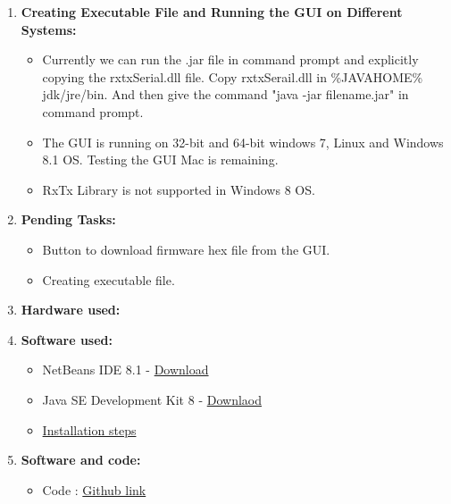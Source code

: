 \documentclass[a4paper,12pt,oneside]{book}
\begin{document}
\begin{enumerate}
\begin{itemize}
		\end{itemize}
		\item \textbf{\large Creating Executable File and Running the GUI on Different Systems:} \\
		\begin{itemize}
			\item Currently we can run the .jar file in command prompt and explicitly copying the rxtxSerial.dll file. Copy rxtxSerail.dll in \%JAVAHOME\% jdk/jre/bin. And then give the command "java -jar filename.jar" in command prompt.
		    \item The GUI is running on 32-bit and 64-bit windows 7, Linux and Windows 8.1 OS. Testing the GUI Mac is remaining.
			\item RxTx Library is not supported in Windows 8 OS.
		\end{itemize} 
		\item \large \textbf{Pending Tasks:}
		\begin{itemize}
			\item Button to download firmware hex file from the GUI.
			\item Creating executable file.
		\end{itemize}
		\newpage
		\item \textbf{\large Hardware used:}
        
        \item \textbf{\large Software used:}
        \begin{itemize}
            \item NetBeans IDE 8.1 - 
             \href{https://netbeans.org/downloads/}{Download}
             \item Java SE Development Kit 8 - 
             \href{http://www.oracle.com/technetwork/java/javase/downloads/jdk8-downloads-2133151.html}{Downlaod}
            \item 
            \href {https://netbeans.org/community/releases/81/install.html}{Installation steps}
        \end{itemize}
        \item \textbf{\large Software and code:}
        \begin{itemize}
        \item Code : 
        \href{https://github.com/eYSIP-2016/GUI-Testing-FirebirdV/tree/Firebird-GUI-Testing--Jatin}{Github link} 
        \end{itemize}
	

\end{enumerate}
\end{document}
